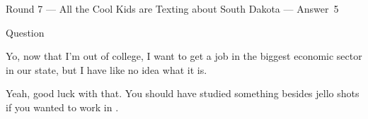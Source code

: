 \documentclass[11pt]{beamer}
\begin{document}
\begin{frame}[t]{Round 7 --- All the Cool Kids are Texting about South Dakota --- \mbox{Answer 5}}
\begin{block}{Question}

\begin{minipage}{0.9\textwidth}
\begin{mdframed}[
    roundcorner=7pt,
    backgroundcolor=black!5,
    linecolor=black!5,
    fontcolor=black,
    ignorelastdescenders]
\begin{flushleft}
{\small{}\selectfont{}
Yo, now that I'm out of college, I want to get a job in the biggest economic sector in our state, but I have like no idea what it is.
}
\end{flushleft}
\end{mdframed}
\end{minipage}

\hfill{}\begin{minipage}{0.9\textwidth}
\begin{mdframed}[
    roundcorner=7pt,
    backgroundcolor=blue!80!white,
    linecolor=blue!80!white,
    fontcolor=white,
    ignorelastdescenders]
\begin{flushleft}
{\small{}\selectfont{}
Yeah, good luck with that.  You should have studied something besides jello shots if you wanted to work in \textunderscore{}\textunderscore{}\textunderscore{}\textunderscore{}\textunderscore{}\textunderscore{}.
}
\end{flushleft}
\end{mdframed}
\end{minipage}
\end{block}
\end{frame}
\end{document}
